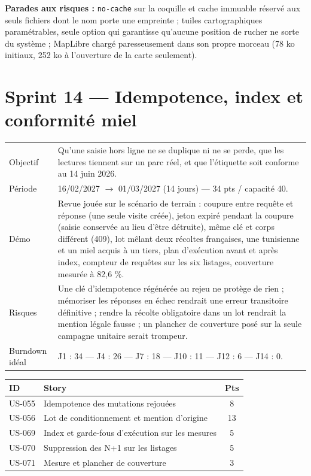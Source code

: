 \textbf{Parades aux risques :} \texttt{no-cache} sur la coquille et cache
immuable réservé aux seuls fichiers dont le nom porte une empreinte ; tuiles
cartographiques paramétrables, seule option qui garantisse qu'aucune position de
rucher ne sorte du système ; MapLibre chargé paresseusement dans son propre
morceau (78 ko initiaux, 252 ko à l'ouverture de la carte seulement).

\section{Sprint 14 --- Idempotence, index et conformité miel}

\begin{center}
\begin{tabular}{lp{11cm}}
\toprule
Objectif  & Qu'une saisie hors ligne ne se duplique ni ne se perde, que les
            lectures tiennent sur un parc réel, et que l'étiquette soit conforme
            au 14 juin 2026. \\
Période   & 16/02/2027 $\rightarrow$ 01/03/2027 (14 jours) --- 34 pts / capacité 40. \\
Démo      & Revue jouée sur le scénario de terrain : coupure entre requête et
            réponse (une seule visite créée), jeton expiré pendant la coupure
            (saisie conservée au lieu d'être détruite), même clé et corps
            différent (409), lot mêlant deux récoltes françaises, une
            tunisienne et un miel acquis à un tiers, plan d'exécution avant et
            après index, compteur de requêtes sur les six listages, couverture
            mesurée à 82,6 \%. \\
Risques   & Une clé d'idempotence régénérée au rejeu ne protège de rien ;
            mémoriser les réponses en échec rendrait une erreur transitoire
            définitive ; rendre la récolte obligatoire dans un lot rendrait la
            mention légale fausse ; un plancher de couverture posé sur la seule
            campagne unitaire serait trompeur. \\
Burndown idéal & J1 : 34 --- J4 : 26 --- J7 : 18 --- J10 : 11 --- J12 : 6 --- J14 : 0. \\
\bottomrule
\end{tabular}
\end{center}

\begin{center}
\begin{tabular}{lp{9cm}c}
\toprule
\textbf{ID} & \textbf{Story} & \textbf{Pts} \\
\midrule
US-055 & Idempotence des mutations rejouées               & 8 \\
US-056 & Lot de conditionnement et mention d'origine      & 13 \\
US-069 & Index et garde-fous d'exécution sur les mesures  & 5 \\
US-070 & Suppression des N+1 sur les listages             & 5 \\
US-071 & Mesure et plancher de couverture                 & 3 \\
\bottomrule
\end{tabular}
\end{center}

